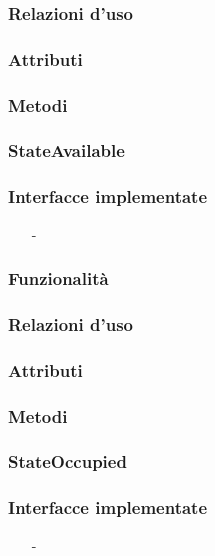 \subsubsection*{Relazioni d'uso}

\subsubsection*{Attributi}

\subsubsection*{Metodi}

\subsubsection{StateAvailable}\label{sec:stateavailable}

\subsubsection*{Interfacce implementate}
\begin{itemize}[noitemsep,nolistsep]
  \item[-]
\end{itemize}

\subsubsection*{Funzionalità}

\subsubsection*{Relazioni d'uso}

\subsubsection*{Attributi}

\subsubsection*{Metodi}

\subsubsection{StateOccupied}\label{sec:stateoccupied}

\subsubsection*{Interfacce implementate}
\begin{itemize}[noitemsep,nolistsep]
  \item[-]
\end{itemize}

